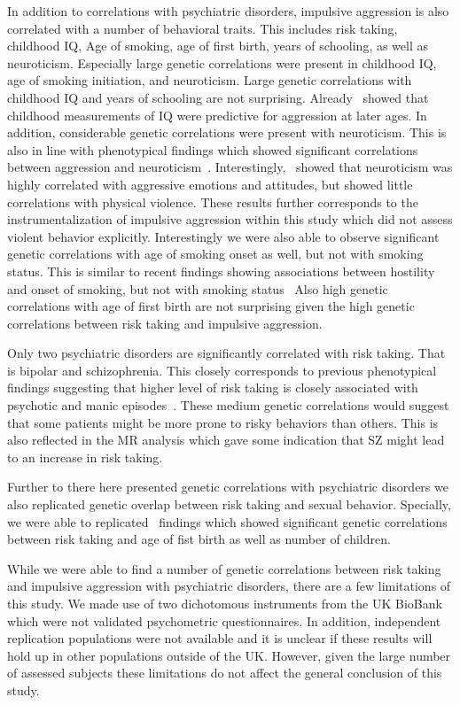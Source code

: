 In addition to correlations with psychiatric disorders, impulsive aggression is also correlated with a number of behavioral traits.
This includes risk taking, childhood IQ, Age of smoking, age of first birth, years of schooling, as well as neuroticism.
Especially large genetic correlations were present in childhood IQ, age of smoking initiation, and neuroticism.
Large genetic correlations with childhood IQ and years of schooling are not surprising.
Already~\citet{Huesmann1987} showed that childhood measurements of IQ were predictive for aggression at later ages.
In addition, considerable genetic correlations were present with neuroticism.
This is also in line with phenotypical findings which showed significant correlations between aggression and neuroticism~\cite{Barlett2012}.
Interestingly,~\citet{Barlett2012} showed that neuroticism was highly correlated with aggressive emotions and attitudes, but showed little correlations with physical violence.
These results further corresponds to the instrumentalization of impulsive aggression within this study which did not assess violent behavior explicitly. 
Interestingly we were also able to observe significant genetic correlations with age of smoking onset as well, but not with smoking status.
This is similar to recent findings showing associations between hostility and onset of smoking, but not with smoking status~\cite{Bernstein2014}
Also high genetic correlations with age of first birth are not surprising given the high genetic correlations between risk taking and impulsive aggression.

Only two psychiatric disorders are significantly correlated with risk taking.
That is bipolar and schizophrenia.
This closely corresponds to previous phenotypical findings suggesting that higher level of risk taking is closely associated with psychotic and manic episodes~\cite{Johnson2012,APA1994,AmericanPsychiatricAssociation2013}.
These medium genetic correlations would suggest that some patients might be more prone to risky behaviors than others.
This is also reflected in the MR analysis which gave some indication that SZ might lead to an increase in risk taking.

Further to there here presented genetic correlations with psychiatric disorders we also replicated genetic overlap between risk taking and sexual behavior.
Specially, we were able to replicated~\citet{Day2016} findings which showed significant genetic correlations between risk taking and age of fist birth as well as number of children.

While we were able to find a number of genetic correlations between risk taking and impulsive aggression with psychiatric disorders, there are a few limitations of this study.
We made use of two dichotomous instruments from the UK BioBank which were not validated psychometric questionnaires.
In addition, independent replication populations were not available and it is unclear if these results will hold up in other populations outside of the UK.
However, given the large number of assessed subjects these limitations do not affect the general conclusion of this study.

